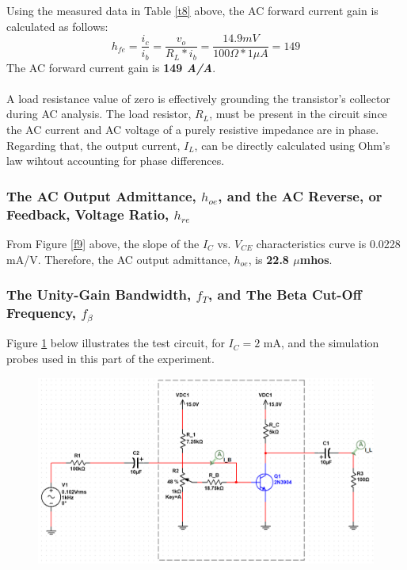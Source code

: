 \documentclass{article}
\begin{document}
	\noindent Using the measured data in Table \ref{t8} above, the AC forward current gain is calculated as follows:
	$$h_{fe} = \frac{i_c}{i_b} = \frac{v_o}{R_L * i_b} = \frac{14.9mV}{100\Omega * 1\mu A} = 149$$
	The AC forward current gain is \textbf{149 \textit{A/A}}.\\\\
	A load resistance value of zero is effectively grounding the transistor's collector during AC analysis.
	The load resistor, $R_L$, must be present in the circuit since the AC current and AC voltage of a purely resistive impedance are in phase.
	Regarding that, the output current, $I_{L}$, can be directly calculated using Ohm's law wihtout accounting for phase differences.
	
	
	\pagebreak
	
	\subsubsection{The AC Output Admittance, $h_{oe}$, and the AC Reverse, or Feedback, Voltage Ratio, $h_{re}$}
	From Figure \ref{f9} above, the slope of the $I_C$ vs. $V_{CE}$ characteristics curve is 0.0228 mA/V.
	Therefore, the AC output admittance, $h_{oe}$, is \textbf{22.8 $\mu$mhos}.
	
	\subsubsection{The Unity-Gain Bandwidth, $f_T$, and The Beta Cut-Off Frequency, $f_{\beta}$}
	Figure \ref{f27} below illustrates the test circuit, for $I_C = 2$ mA, and the simulation probes used in this part of the experiment.
	
	\begin{figure}[!ht]
		\centering
		\includegraphics[width=0.8\linewidth]{part4-e-circuit-2ma.png}
		\label{f27}
	\end{figure}
\end{document}
